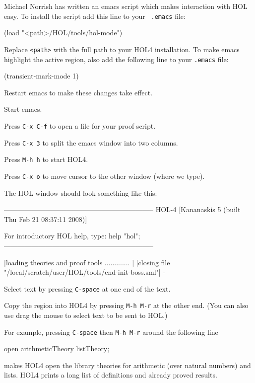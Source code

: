 \documentclass[a4paper,10pt]{article}
\begin{document}

Michael Norrish has written an emacs script which makes interaction
with HOL easy. To install the script add this line to your {\tt
.emacs} file:
\begin{code}
(load "<path>/HOL/tools/hol-mode")
\end{code}
Replace {\tt <path>} with the full path to your HOL4 installation. To make
emacs highlight the active region, also add the following line to your
{\tt .emacs} file:
\begin{code}
(transient-mark-mode 1)
\end{code}
Restart emacs to make these changes take effect.


\begin{enum}
\item Start emacs.
\item Press {\tt C-x C-f} to open a file for your proof script.
\item Press {\tt C-x 3} to split the emacs window into two columns.
\item Press {\tt M-h h} to start HOL4.
\item Press {\tt C-x o} to move cursor to the other window (where we type).
\end{enum}
The HOL window should look something like this:
\begin{code}
-----------------------------------------------------------------
       HOL-4 [Kananaskis 5 (built Thu Feb 21 08:37:11 2008)]

       For introductory HOL help, type: help "hol";
-----------------------------------------------------------------

[loading theories and proof tools ............. ]
[closing file "/local/scratch/user/HOL/tools/end-init-boss.sml"]
-
\end{code}


\begin{enum}
\item Select text by pressing {\tt C-space} at one end of the text.
\item Copy the region into HOL4 by pressing {\tt M-h M-r} at the other
  end. (You can also use drag the mouse to select text to be sent to
  HOL.)
\end{enum}
For example, pressing {\tt C-space} then {\tt M-h M-r} around the following line
\begin{code}
open arithmeticTheory listTheory;
\end{code}
makes HOL4 open the library theories for arithmetic (over natural numbers)
and lists. HOL4 prints a long list of definitions and already proved results.
\end{document}
